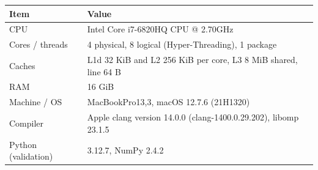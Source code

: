 \begin{tabular}{lp{11cm}}
\toprule
Item & Value \\
\midrule
CPU & Intel Core i7-6820HQ CPU @ 2.70GHz \\
Cores / threads & 4 physical, 8 logical (Hyper-Threading), 1 package \\
Caches & L1d 32 KiB and L2 256 KiB per core, L3 8 MiB shared, line 64 B \\
RAM & 16 GiB \\
Machine / OS & MacBookPro13,3, macOS 12.7.6 (21H1320) \\
Compiler & Apple clang version 14.0.0 (clang-1400.0.29.202), libomp 23.1.5 \\
Python (validation) & 3.12.7, NumPy 2.4.2 \\
\bottomrule
\end{tabular}
